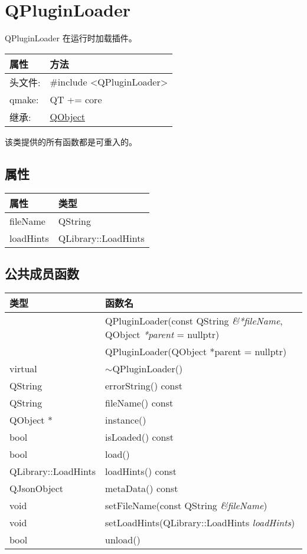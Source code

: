 \chapter{QPluginLoader}

QPluginLoader 在运行时加载插件。

\begin{tabular}{|l|l|}
\hline
属性 &	方法\\
\hline
头文件:& 	\#include <QPluginLoader>\\
\hline
qmake:& 	QT += core\\
\hline
继承:	&  \href{https://gitee.com/wcc210/QtDocumentCN/blob/master/Src/O/QObject/QObject.md}{QObject} \\
\hline
\end{tabular}

\begin{notice}
该类提供的所有函数都是可重入的。
\end{notice}


\section{属性}


\begin{tabular}{|l|l|}
\hline
属性 &	类型\\
\hline
fileName &	QString \\ 
\hline
loadHints	& QLibrary::LoadHints \\ 
\hline
\end{tabular}

\section{公共成员函数}

\begin{longtable}{|l|m{25em}|}
\hline
 类型& 	函数名\\
\hline
& QPluginLoader(const QString \emph{\&*fileName}, QObject \emph{*parent} = nullptr) \\
\hline
&QPluginLoader(QObject *parent = nullptr) \\
\hline
virtual	&$\sim$QPluginLoader() \\
\hline
QString	&errorString() const \\
\hline
QString	&fileName() const \\
\hline
QObject *	&instance() \\
\hline
bool	&isLoaded() const \\
\hline
bool	&load() \\
\hline
QLibrary::LoadHints	&loadHints() const \\
\hline
QJsonObject	&metaData() const \\
\hline
void	&setFileName(const QString \emph{\&fileName}) \\
\hline
void&	setLoadHints(QLibrary::LoadHints \emph{loadHints}) \\
\hline
bool&	unload() \\
\hline
\end{longtable}

